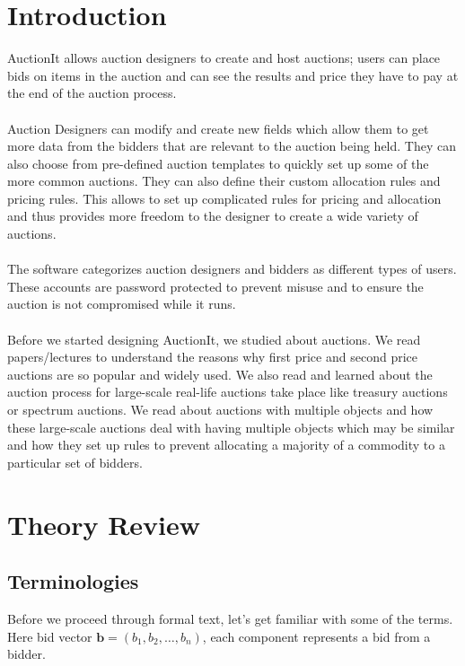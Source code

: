 \documentclass[a4paper]{article}
\begin{document}
\pagebreak
\section*{Introduction}
AuctionIt allows auction designers to create and host auctions; users can place bids on items in the auction and can see the results and price they have to pay at the end of the auction process.
\\\\ Auction Designers can modify and create new fields which allow them to get more data from the bidders that are relevant to the auction being held. They can also choose from pre-defined auction templates to quickly set up some of the more common auctions. They can also define their custom allocation rules and pricing rules. This allows to set up complicated rules for pricing and allocation and thus provides more freedom to the designer to create a wide variety of auctions. 
\\\\
The software categorizes auction designers and bidders as different types of users. These accounts are password protected to prevent misuse and to ensure the auction is not compromised while it runs.
\\\\
Before we started designing AuctionIt, we studied about auctions. We read papers/lectures to understand the reasons why first price and second price auctions are so popular and widely used. We also read and learned about the auction process for large-scale real-life auctions take place like treasury auctions or spectrum auctions. We read about auctions with multiple objects and how these large-scale auctions deal with having multiple objects which may be similar and how they set up rules to prevent allocating a majority of a commodity to a particular set of bidders.



\pagebreak
\thispagestyle{note_1}
\section*{Theory Review}
\subsection*{Terminologies \cite{stanford}} 
Before we proceed through formal text, let's get familiar with some of the terms.
Here bid vector \cite{stanford} $\mathbf{b} = (b_1, b_2,\ldots,b_n)$, each component represents a bid from a bidder.
\end{document}

